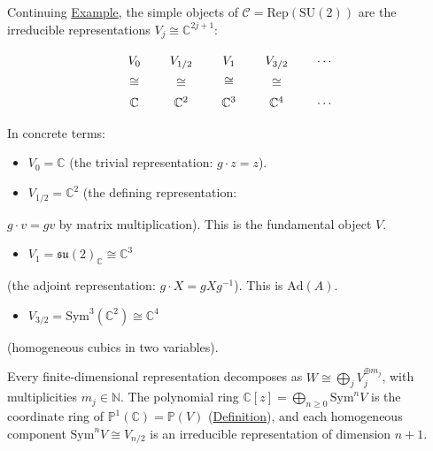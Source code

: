 \begin{example}
  \label{ex:spin-labels-su2}
Continuing \hyperref[ex:qou-su2]{Example}, the simple objects of
$\mathcal{C} = \mathrm{Rep}(\mathrm{SU}(2))$ are the irreducible
representations $V_j \cong \mathbb{C}^{2j+1}$:

\begin{equation}\label{eq:spin-decomposition}
\begin{tikzcd}[row sep=1.5em, column sep=1.5em]
  V_0 \ar[d, phantom, "\cong"] & V_{1/2} \ar[d, phantom, "\cong"]
    & V_1 \ar[d, phantom, "\cong"] & V_{3/2} \ar[d, phantom, "\cong"]
    & \cdots \\
  \mathbb{C} & \mathbb{C}^2 & \mathbb{C}^3 & \mathbb{C}^4 & \cdots
\end{tikzcd}
\end{equation}

In concrete terms:

\begin{itemize}
  \item $V_0 = \mathbb{C}$ (the trivial representation: $g \cdot z = z$).
  \item $V_{1/2} = \mathbb{C}^2$ (the defining representation:
\end{itemize}
  $g \cdot v = gv$ by matrix multiplication). This is the
  fundamental object $V$.
\begin{itemize}
  \item $V_1 = \mathfrak{su}(2)_{\mathbb{C}} \cong \mathbb{C}^3$
\end{itemize}
  (the adjoint representation: $g \cdot X = gXg^{-1}$). This is
  $\mathrm{Ad}(A)$.
\begin{itemize}
  \item $V_{3/2} = \mathrm{Sym}^3(\mathbb{C}^2) \cong \mathbb{C}^4$
\end{itemize}
  (homogeneous cubics in two variables).

Every finite-dimensional representation decomposes as
$W \cong \bigoplus_j V_j^{\oplus m_j}$, with multiplicities
$m_j \in \mathbb{N}$. The polynomial ring
$\mathbb{C}[z] = \bigoplus_{n \geq 0} \mathrm{Sym}^n V$ is the
coordinate ring of $\mathbb{P}^1(\mathbb{C}) = \mathbb{P}(V)$
(\hyperref[def:projective-line-object]{Definition}), and each homogeneous
component $\mathrm{Sym}^n V \cong V_{n/2}$ is an irreducible
representation of dimension $n + 1$.
\end{example}

